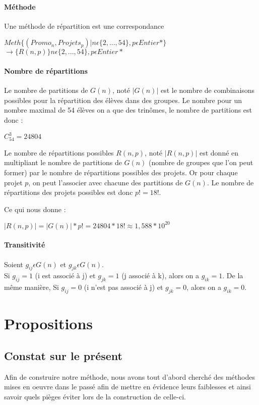 \documentclass[10pt,a4paper]{scrartcl}
\begin{document}
\paragraph{Méthode} Une méthode de répartition est une correspondance 
\begin{center}
	$Meth\lbrace(Promo_{n}, Projets_{p}) | n\epsilon \lbrace2,...,54\rbrace, p\epsilon Entier* \rbrace$
	$\rightarrow\lbrace R(n,p)\rbrace  n\epsilon \lbrace2,...,54\rbrace, p\epsilon Entier*$
\end{center}

\paragraph{Nombre de répartitions}
Le nombre de partitions de $G(n)$, noté $|G(n)|$ est le nombre de combinaisons possibles pour la répartition des élèves dans des groupes.
Le nombre pour un nombre maximal de 54 élèves on a que des trinômes, le nombre de partitions est donc :
\begin{center}
	$C_{54}^3 = 24804$
\end{center}

Le nombre de répartitions possibles $R(n,p)$, noté $|R(n,p)|$ est donné en multipliant le nombre de partitions de $G(n)$ (nombre de groupes que l'on peut former) par le nombre de répartitions possibles des projets. Or pour chaque projet $p$, on peut l'associer avec chacune des partitions de $G(n)$.
Le nombre de répartitions des projets possibles est donc $p! = 18!$.

Ce qui nous donne :
\begin{center}
	$|R(n,p)| = |G(n)| * p! = 24804 * 18! \approx 1,588*10^{20}$
\end{center}

\paragraph{Transitivité}
Soient $g_{ij}\epsilon G(n)$ et $g_{jk}\epsilon G(n)$. \\
Si $g_{ij} = 1$ (i est associé à j) et $g_{jk} = 1$ (j associé à k), alors on a $g_{ik} = 1$.
De la même manière, Si $g_{ij} = 0$ (i n'est pas associé à j) et $g_{jk} = 0$, alors on a $g_{ik} = 0$.

\section{Propositions}
\subsection{Constat sur le présent}
Afin de construire notre méthode, nous avons tout d'abord cherché des méthodes mises en oeuvre dans le passé afin de mettre en évidence leurs faiblesses et ainsi savoir quels pièges éviter lors de la construction de celle-ci.\\
\end{document}

